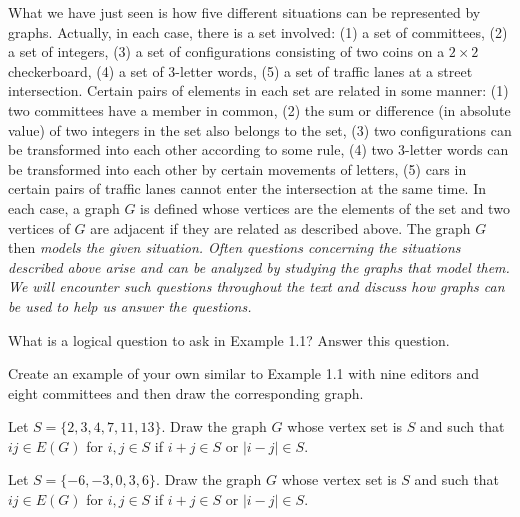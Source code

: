 

What we have just seen is how five different situations can be represented by graphs. Actually, in each case, there is a set involved: (1) a set of committees, (2) a set of integers, (3) a set of configurations consisting of two coins on a $2 \times 2$ checkerboard, (4) a set of 3-letter words, (5) a set of traffic lanes at a street intersection. Certain pairs of elements in each set are related in some manner: (1) two committees have a member in common, (2) the sum or difference (in absolute value) of two integers in the set also belongs to the set, (3) two configurations can be transformed into each other according to some rule, (4) two 3-letter words can be transformed into each other by certain movements of letters, (5) cars in certain pairs of traffic lanes cannot enter the intersection at the same time. In each case, a graph $G$ is defined whose vertices are the elements of the set and two vertices of $G$ are adjacent if they are related as described above. The graph $G$ then \it{models} the given situation. Often questions concerning the situations described above arise and can be analyzed by studying the graphs that model them. We will encounter such questions throughout the text and discuss how graphs can be used to help us answer the questions.

\begin{exers}\end{exers}

\begin{exer}
What is a logical question to ask in Example 1.1? Answer this question.
\end{exer}

\begin{exer}
Create an example of your own similar to Example 1.1 with nine editors and eight committees and then draw the corresponding graph.
\end{exer}

\begin{exer}
Let $S = \{2,3,4,7,11,13\}$. Draw the graph $G$ whose vertex set is $S$ and such that $ij \in E(G)$ for $i,j \in S$ if $i+j \in S$ or $|i-j| \in S$.
\end{exer}

\begin{exer}
Let $S = \{-6,-3,0,3,6\}$. Draw the graph $G$ whose vertex set is $S$ and such that $ij \in E(G)$ for $i,j \in S$ if $i+j \in S$ or $|i-j| \in S$.
\end{exer}

